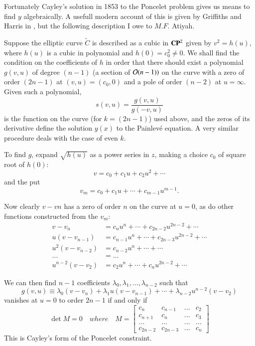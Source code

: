 Fortunately Cayley's solution in 1853 to the Poncelet problem gives us means to find $y$ algebraically. A usefull modern account of this is given by Griffiths and Harris in \cite{art7-key5}, but the following description I owe to $M. F.$ Atiyah.

Suppose the elliptic curve $\tilde{C}$ is described as a cubic in $\mathbf{C}\mathbf{P}^{2}$ given by $v^{2}=h(u)$, where $h(u)$ is a cubic in polynomial and $h(0)= c_{0}^{2} \neq 0$. We shall find the condition on the coefficients of $h$ in order that there should exist a polynomial $g(v,u)$ of degree $(n-1)$ (a section of $\mathcal{O}(n-1))$ on the curve with a zero of order $(2n-1)$ at $(v,u)=(c_{0},0)$ and a pole of order $(n-2)$ at $u=\infty$. Given such a polynomial,
$$
s(v,u)= \dfrac{g(v,u)}{g(-v,u)}
$$
is the function on the curve (for $k=(2n-1)$) used above, and the zeros of its derivative define the solution $y(x)$ to the Painlev\'e equation. A very similar procedure deals with the case of even $k$.

 To find $g$, expand $\sqrt{h(u)}$ as a power series in $z$, making a choice $c_{0}$ of square root of $h(0)$:
 $$
 v = c_{0}+c_{1}u+c_{2}u^{2}+ \cdots
 $$
 and the put
 $$
 v_{m}=c_{0}+c_{1}u+\cdots + c_{m-1}u^{m-1}.
 $$

 Now clearly $v-v{n}$ has a zero of order $n$ on the curve at $u=0$, as do other functions constructed from the $v_{m}$:
\begin{align*}
v-v_{n} &= c_{n}u^{n}+\cdots +c_{2n-2}u^{2n-2} + \cdots\\
u(v-v_{n-1}) &= c_{n-1}u^{n}+ \cdots + c_{2n-3}u^{2n-2}+ \cdots\\
u^{2}(v-v_{n-2}) &= c_{n-2}u^{n}+ \cdots + \cdots\\
\ldots \quad &= \ldots\\
u^{n-2}(v-v_{2}) &= c_{2}u^{n}+ \cdots + c_{n}u^{2n-2}+\cdots
\end{align*}

We can then find $n-1$ coefficients $\lambda_{0}, \lambda_{1},\ldots,\lambda_{n-2}$ such that 
$$
g(v,u) \equiv \lambda_{0}(v-v_{n}) + \lambda_{1}u(v-v_{n-1})+ \cdots+ \lambda_{n-2}u^{n-2}(v-v_{2})
$$
vanishes at $u=0$ to order $2n-1$ if and only if
\begin{equation}\label{art7-eq-17}
\det M=0 \quad where \quad M =
\begin{bmatrix}
c_{n} & c_{n-1} &\ldots &c_{2}\\
c_{n+1} & c_{n} &\ldots & c_{3}\\
\ldots & \ldots & \ldots & \ldots\\
c_{2n-2} & c_{2n-3} & \ldots & c_{n}
\end{bmatrix}
\end{equation}
This is Cayley's form of the Poncelet constraint.

